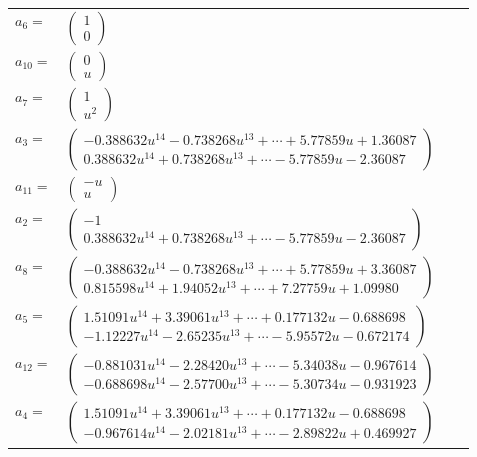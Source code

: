 \documentclass[1p]{elsarticle_modified}
\theoremstyle{definition}
\begin{document}
\begin{tabular}{m{7pt} m{180pt} m{7pt} m{180pt} }
\flushright $a_{6}=$&$\begin{pmatrix}1\\0\end{pmatrix}$ \\
\flushright $a_{10}=$&$\begin{pmatrix}0\\u\end{pmatrix}$ \\
\flushright $a_{7}=$&$\begin{pmatrix}1\\u^2\end{pmatrix}$ \\
\flushright $a_{3}=$&$\begin{pmatrix}-0.388632 u^{14}-0.738268 u^{13}+\cdots+5.77859 u+1.36087\\0.388632 u^{14}+0.738268 u^{13}+\cdots-5.77859 u-2.36087\end{pmatrix}$ \\
\flushright $a_{11}=$&$\begin{pmatrix}- u\\u\end{pmatrix}$ \\
\flushright $a_{2}=$&$\begin{pmatrix}-1\\0.388632 u^{14}+0.738268 u^{13}+\cdots-5.77859 u-2.36087\end{pmatrix}$ \\
\flushright $a_{8}=$&$\begin{pmatrix}-0.388632 u^{14}-0.738268 u^{13}+\cdots+5.77859 u+3.36087\\0.815598 u^{14}+1.94052 u^{13}+\cdots+7.27759 u+1.09980\end{pmatrix}$ \\
\flushright $a_{5}=$&$\begin{pmatrix}1.51091 u^{14}+3.39061 u^{13}+\cdots+0.177132 u-0.688698\\-1.12227 u^{14}-2.65235 u^{13}+\cdots-5.95572 u-0.672174\end{pmatrix}$ \\
\flushright $a_{12}=$&$\begin{pmatrix}-0.881031 u^{14}-2.28420 u^{13}+\cdots-5.34038 u-0.967614\\-0.688698 u^{14}-2.57700 u^{13}+\cdots-5.30734 u-0.931923\end{pmatrix}$ \\
\flushright $a_{4}=$&$\begin{pmatrix}1.51091 u^{14}+3.39061 u^{13}+\cdots+0.177132 u-0.688698\\-0.967614 u^{14}-2.02181 u^{13}+\cdots-2.89822 u+0.469927\end{pmatrix}$ \\

\end{tabular}
\end{document}
